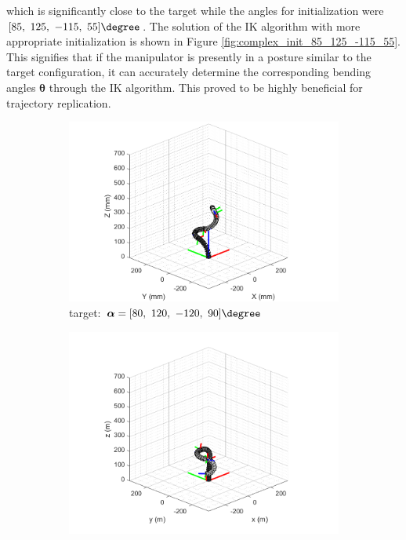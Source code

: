 which is significantly close to the target while the angles for initialization were $[85,\ 125,\ -115,\ 55]\degree$. 
The solution of the IK algorithm with more appropriate initialization is shown in Figure 
\ref{fig:complex_init_85_125_-115_55}. This signifies that if the manipulator is presently in a posture similar 
to the target configuration, it can accurately determine the corresponding bending angles $\boldsymbol{\theta}$ through the 
IK algorithm. This proved to be highly beneficial for trajectory replication. 
\begin{figure}[H] %
    \centering 
    \captionsetup{labelsep=colon}
    \begin{subfigure}{0.9\textwidth} %
        \centering
        \includegraphics[width=\linewidth]{Image/MATLAB/manipulator_80_120_-120_90.png}
        \caption{\centering target: $\boldsymbol{\alpha} = [80,\ 120,\ -120,\ 90] \degree$ \\ \qquad}
        \label{fig:complex_target}
    \end{subfigure}
    \begin{subfigure}{0.49\textwidth} %
        \centering
        \includegraphics[width=\linewidth]{Image/MATLAB/manipulator_-8.88_-89.99_-126.81_-169.73.png}

\end{subfigure}
\end{figure}
